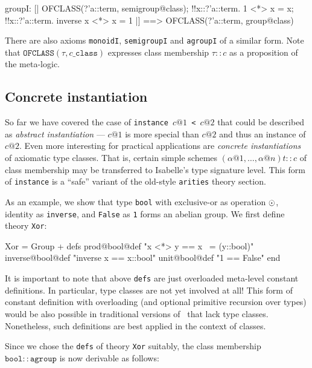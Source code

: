 \begin{ascbox}
groupI:   [| OFCLASS(?'a::term, semigroup@class);
             !!x::?'a::term. 1 <*> x = x;
             !!x::?'a::term. inverse x <*> x = 1 |]
          ==> OFCLASS(?'a::term, group@class)

There are also axioms \texttt{monoidI}, \texttt{semigroupI} and \texttt{agroupI}
of a similar form.  Note that $\texttt{OFCLASS}(\tau, c \texttt{_class})$
expresses class membership $\tau :: c$ as a proposition of the
meta-logic.


\subsection{Concrete instantiation}

So far we have covered the case of \texttt{instance $c@1$ < $c@2$} that
could be described as \emph{abstract instantiation} --- $c@1$ is more
special than $c@2$ and thus an instance of $c@2$. Even more
interesting for practical applications are \emph{concrete instantiations}
of axiomatic type classes. That is, certain simple schemes $(\alpha@1,
\ldots, \alpha@n)t :: c$ of class membership may be transferred to
Isabelle's type signature level. This form of \texttt{instance} is a ``safe''
variant of the old-style \texttt{arities} theory section.

As an example, we show that type \texttt{bool} with exclusive-or as
operation $\odot$, identity as \texttt{inverse}, and \texttt{False} as \texttt{1}
forms an abelian group. We first define theory \texttt{Xor}:

\begin{ascbox}
Xor = Group +\medskip
defs
  prod@bool@def     "x <*> y   == x ~= (y::bool)"
  inverse@bool@def  "inverse x == x::bool"
  unit@bool@def     "1         == False"\medskip
end

It is important to note that above \texttt{defs} are just overloaded
meta-level constant definitions. In particular, type classes are not
yet involved at all! This form of constant definition with overloading
(and optional primitive recursion over types) would be also possible
in traditional versions of \HOL\ that lack type classes.
Nonetheless, such definitions are best applied in the context of
classes.

\medskip

Since we chose the \texttt{defs} of theory \texttt{Xor} suitably, the class
membership $\texttt{bool} :: \texttt{agroup}$ is now derivable as follows:


\end{ascbox}
\end{ascbox}
